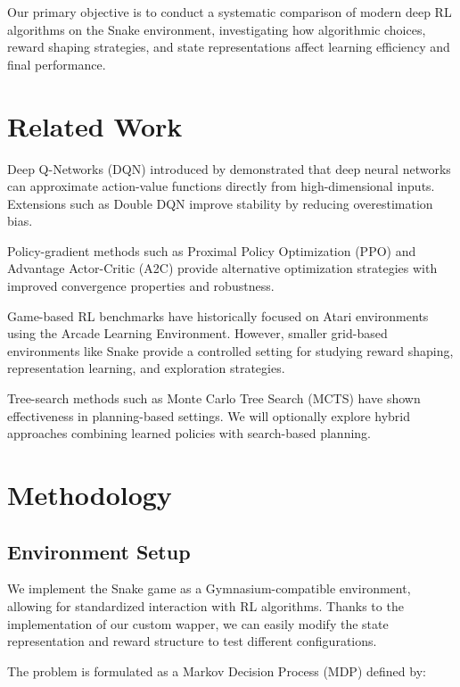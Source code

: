 \documentclass[10pt,twocolumn,letterpaper]{article}
\begin{document}
Our primary objective is to conduct a systematic comparison of modern deep RL algorithms on the Snake environment, investigating how algorithmic choices, reward shaping strategies, and state representations affect learning efficiency and final performance. 

\section{Related Work}

Deep Q-Networks (DQN) introduced by \cite{mnih2015human} demonstrated that deep neural networks can approximate action-value functions directly from high-dimensional inputs. Extensions such as Double DQN \cite{van2016deep}  improve stability by reducing overestimation bias.

Policy-gradient methods such as Proximal Policy Optimization (PPO) \cite{schulman2017proximal} and Advantage Actor-Critic (A2C) \cite{mnih2016asynchronous} provide alternative optimization strategies with improved convergence properties and robustness.

Game-based RL benchmarks have historically focused on Atari environments using the Arcade Learning Environment. However, smaller grid-based environments like Snake provide a controlled setting for studying reward shaping, representation learning, and exploration strategies.

Tree-search methods such as Monte Carlo Tree Search (MCTS) \cite{browne2012survey} have shown effectiveness in planning-based settings. We will optionally explore hybrid approaches combining learned policies with search-based planning.

\section{Methodology}

\subsection{Environment Setup}

We implement the Snake game as a Gymnasium-compatible environment, allowing for standardized interaction with RL algorithms. Thanks to the implementation of our custom wapper, we can easily modify the state representation and reward structure to test different configurations. 

The problem is formulated as a Markov Decision Process (MDP) defined by:
\end{document}
